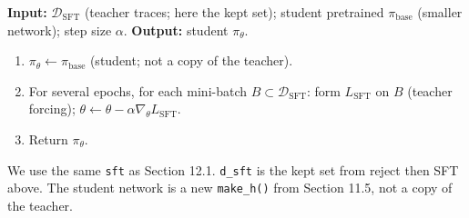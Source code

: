 \begin{implnote}
\textbf{Input:} $\mathcal{D}_{\mathrm{SFT}}$ (teacher traces; here the kept set); student pretrained $\pi_{\mathrm{base}}$ (smaller network); step size $\alpha$. \textbf{Output:} student $\pi_\theta$.

\begin{enumerate}
\item $\pi_\theta\leftarrow\pi_{\mathrm{base}}$ (student; not a copy of the teacher).
\item For several epochs, for each mini-batch $B\subset\mathcal{D}_{\mathrm{SFT}}$: form $L_{\mathrm{SFT}}$ on $B$ (teacher forcing); $\theta\leftarrow\theta-\alpha\nabla_\theta L_{\mathrm{SFT}}$.
\item Return $\pi_\theta$.
\end{enumerate}

\end{implnote}

We use the same \texttt{sft} as Section 12.1. \texttt{d\_sft} is the kept set from reject then SFT above. The student network is a new \texttt{make\_h()} from Section 11.5, not a copy of the teacher.



